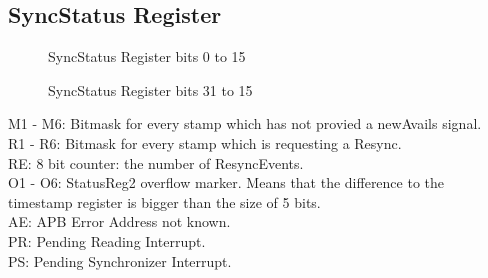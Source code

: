 \subsection{SyncStatus Register} 
\label{sec:syncStatusReg}
\begin{figure}[htb]
	\begin{center}
	\end{center}
	\caption[SyncStatus Register bits 0 to 15]{SyncStatus Register bits 0 to 15}
	\label{fig:SSR11}
\end{figure}
\begin{figure}[htb]
	\begin{center}
	\end{center}
	\caption[SyncStatus Register bits 31 to 16]{SyncStatus Register bits 31 to 15}
	\label{fig:SSR12}
\end{figure}
\noindent
M1 - M6: Bitmask for every stamp which has not provied a newAvails signal. \\
R1 - R6: Bitmask for every stamp which is requesting a Resync. \\ 
RE: 8 bit counter: the number of ResyncEvents. \\ 
O1 - O6: StatusReg2 overflow marker. Means that the difference to the timestamp register is bigger than the size of 5 bits. \\ 
AE: APB Error Address not known. \\ 
PR: Pending Reading Interrupt. \\
PS: Pending Synchronizer Interrupt. \\
